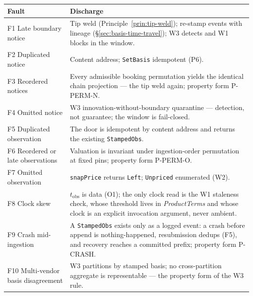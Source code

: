 \renewcommand{\arraystretch}{1.15}
\begin{center}
\begin{longtable}{@{}p{4.0cm} p{9.4cm}@{}}
\toprule
\textbf{Fault} & \textbf{Discharge} \\
\midrule
\endhead
F1 Late boundary notice & Tip weld (Principle~\ref{prin:tip-weld}); re-stamp events
with lineage (\S\ref{sec:basis-time-travel}); W3 detects and W1 blocks in the
window. \\
F2 Duplicated notice & Content address; \texttt{SetBasis} idempotent (P6). \\
F3 Reordered notices & Every admissible booking permutation yields the identical
chain projection --- the tip weld again; property form P-PERM-N. \\
F4 Omitted notice & W3 innovation-without-boundary quarantine --- detection, not
guarantee; the window is fail-closed. \\
F5 Duplicated observation & The door is idempotent by content address and returns
the existing \texttt{StampedObs}. \\
F6 Reordered or late observations & Valuation is invariant under ingestion-order
permutation at fixed pins; property form P-PERM-O. \\
F7 Omitted observation & \texttt{snapPrice} returns \texttt{Left};
\texttt{Unpriced} enumerated (W2). \\
F8 Clock skew & $t_{\mathrm{obs}}$ is data (O1); the only clock read is the W1
staleness check, whose threshold lives in \emph{ProductTerms} and whose clock is an
explicit invocation argument, never ambient. \\
F9 Crash mid-ingestion & A \texttt{StampedObs} exists only as a logged event: a
crash before append is nothing-happened, resubmission dedups (F5), and recovery
reaches a committed prefix; property form P-CRASH. \\
F10 Multi-vendor basis disagreement & W3 partitions by stamped basis; no
cross-partition aggregate is representable --- the property form of the W3 rule. \\
\bottomrule
\end{longtable}
\end{center}

